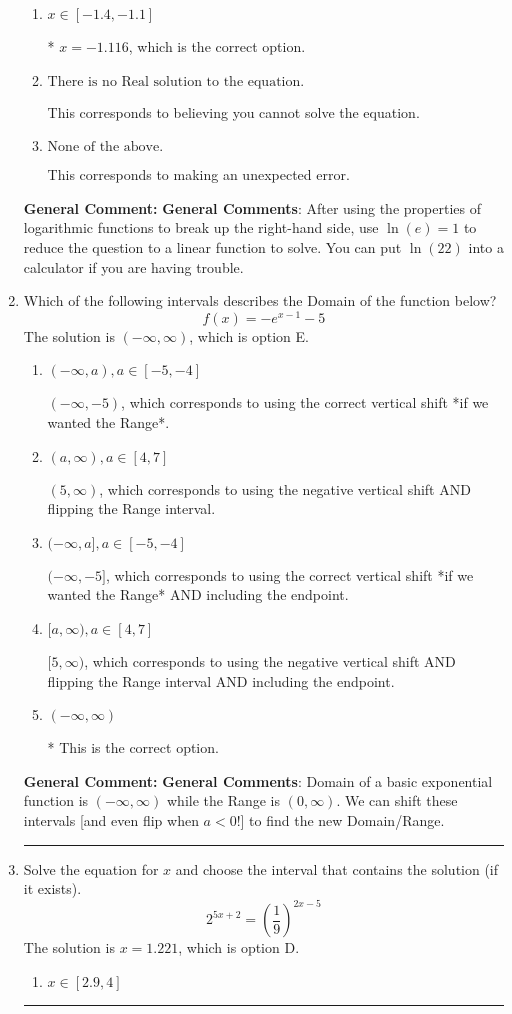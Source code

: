\documentclass{extbook}[14pt]
\newcommand{\litem}[1]{\item #1

\rule{\textwidth}{0.4pt}}
\begin{document}
\begin{enumerate}
{\begin{enumerate}[label=\Alph*.]
$x = -11.418$, which corresponds to thinking you don't need to take the natural log of both sides before reducing, as if the equation already had a natural log on the right side.
\item \( x \in [-1.4, -1.1] \)

* $x = -1.116$, which is the correct option.
\item \( \text{There is no Real solution to the equation.} \)

This corresponds to believing you cannot solve the equation.
\item \( \text{None of the above.} \)

This corresponds to making an unexpected error.
\end{enumerate}

\textbf{General Comment:} \textbf{General Comments}: After using the properties of logarithmic functions to break up the right-hand side, use $\ln(e) = 1$ to reduce the question to a linear function to solve. You can put $\ln(22)$ into a calculator if you are having trouble.
}
\litem{
Which of the following intervals describes the Domain of the function below?
\[ f(x) = -e^{x-1}-5 \]
The solution is \( (-\infty, \infty) \), which is option E.\begin{enumerate}[label=\Alph*.]
\item \( (-\infty, a), a \in [-5, -4] \)

$(-\infty, -5)$, which corresponds to using the correct vertical shift *if we wanted the Range*.
\item \( (a, \infty), a \in [4, 7] \)

$(5, \infty)$, which corresponds to using the negative vertical shift AND flipping the Range interval.
\item \( (-\infty, a], a \in [-5, -4] \)

$(-\infty, -5]$, which corresponds to using the correct vertical shift *if we wanted the Range* AND including the endpoint.
\item \( [a, \infty), a \in [4, 7] \)

$[5, \infty)$, which corresponds to using the negative vertical shift AND flipping the Range interval AND including the endpoint.
\item \( (-\infty, \infty) \)

* This is the correct option.
\end{enumerate}

\textbf{General Comment:} \textbf{General Comments}: Domain of a basic exponential function is $(-\infty, \infty)$ while the Range is $(0, \infty)$. We can shift these intervals [and even flip when $a<0$!] to find the new Domain/Range.
}
\litem{
Solve the equation for $x$ and choose the interval that contains the solution (if it exists).
\[ 2^{5x+2} = \left(\frac{1}{9}\right)^{2x-5} \]
The solution is \( x = 1.221 \), which is option D.\begin{enumerate}[label=\Alph*.]
\item \( x \in [2.9, 4] \)


\end{enumerate}}
\end{enumerate}
\end{document}
